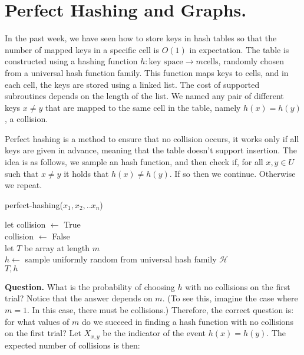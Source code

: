

\newcommand{\image}{\text{ Im } }



\ifdefined\BOOK
\else
\setcounter{chapter}{8}
\fi

\chapter{Perfect Hashing and Graphs.}

In the past week, we have seen how to store keys in hash tables so that the number of mapped keys in a specific cell is $O(1)$ in expectation. The table is constructed using a hashing function $h : \text{key space} \rightarrow m \text{cells}$, randomly chosen from a universal hash function family. This function maps keys to cells, and in each cell, the keys are stored using a linked list. The cost of supported subroutines depends on the length of the list. We named any pair of different keys $x\neq y$ that are mapped to the same cell in the table, namely $h(x) = h(y)$, a collision.

Perfect hashing is a method to ensure that no collision occurs, it works only if all keys are given in advance, meaning that the table doesn't support insertion. The idea is as follows, we sample an hash function, and then check if, for all $x,y \in U$ such that $x \neq y$ it holds that $h(x)\neq h(y)$. If so then we continue. Otherwise we repeat. 

  \begin{algorithm}
  \caption{perfect-hashing($x_{1},x_{2},..x_{n}$)}
  let collision $\leftarrow$ True\\
   {
    collision $\leftarrow$ False\\
    let $T$ be array at length $m$ \\
    $h \leftarrow $ sample uniformly random from universal hash family $\mathcal{H}$\\
  }
  \Return $T,h$
  \end{algorithm}

  \textbf{Question.} What is the probability of choosing $h$ with no collisions on the first trial? Notice that the answer depends on $m$. (To see this, imagine the case where $m=1$. In this case, there must be collisions.) Therefore, the correct question is: for what values of $m$ do we succeed in finding a hash function with no collisions on the first trial? Let $X_{x,y}$ be the indicator of the event $h(x)=h(y)$. The expected number of collisions is then:

